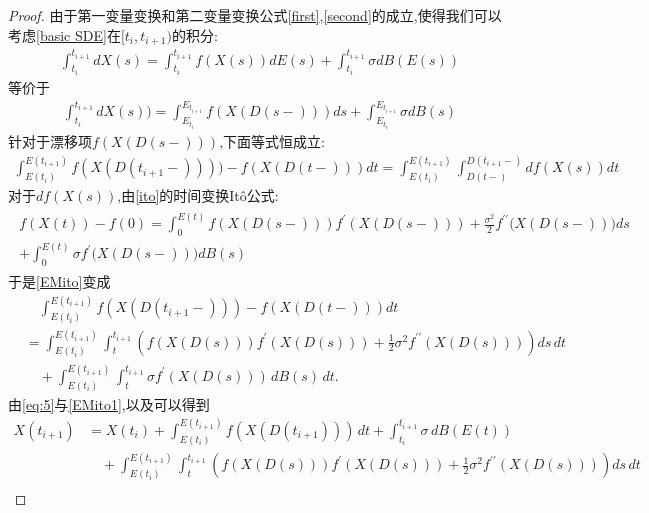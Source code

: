 \begin{proof}
	由于第一变量变换和第二变量变换公式\cref{first},\cref{second}的成立,使得我们可以考虑\cref{basic SDE}在$[t_i,t_{i+1})$的积分:
	\begin{align}
		\int_{t_i}^{t_{i+1}}dX(s)=\int_{t_i}^{t_{i+1}}f(X(s))dE(s)+\int_{t_i}^{t_{i+1}}\sigma dB(E(s))
	\end{align}
	等价于
	\begin{align}\label{eq:5}
		\int_{t_i}^{t_{i+1}}dX(s))=\int_{E_{t_i}}^{E_{t_{i+1}}}f(X(D(s-)))ds+\int_{E_{t_i}}^{E_{t_{i+1}}}\sigma dB(s)
	\end{align}
	针对于漂移项$f(X(D(s-)))$,下面等式恒成立:
	\begin{align}\label{EMito}
		\int_{E(t_i)}^{E(t_{i+1})} f(X(D(t_{i+1}-)))) - f(X(D(t-))) dt = \int_{E(t_i)}^{E(t_{i+1})} \int^{D(t_{i+1}-)}_{D(t-)} df(X(s)) dt
	\end{align}
	对于$df(X(s))$,由\cref{ito}的时间变换It\^{o}公式:
	\begin{align*}
		\begin{gathered}
			f(X(t))-f(0)=\int_{0}^{E(t)}f(X(D(s-)))f^{\prime}\left(X(D(s-))\right)+\frac{\sigma^{2}}{2}f^{\prime\prime}\big(X(D(s-))\big)ds \\
			+\int_{0}^{E(t)}\sigma f^{\prime}\big(X(D(s-))\big)dB(s)
		\end{gathered}
	\end{align*}
	于是\cref{EMito}变成
	\begin{equation}\label{EMito1}
		\begin{aligned}
			&\quad\int_{E(t_i)}^{E(t_{i+1})} f(X(D(t_{i+1}-))) - f(X(D(t-))) dt \\
			&= \int_{E(t_i)}^{E(t_{i+1})} \int_{t}^{t_{i+1}} \left( f(X(D(s))) f^{\prime}(X(D(s))) + \frac{1}{2} \sigma^2 f^{\prime\prime}(X(D(s))) \right) ds \, dt\\
			&\quad + \int_{E(t_i)}^{E(t_{i+1})} \int_{t}^{t_{i+1}} \sigma f^{\prime}(X(D(s))) \, dB(s) \, dt .
		\end{aligned}
	\end{equation}
	由\cref{eq:5}与\cref{EMito1},以及\cite[Theorem 3.1]{kobayashi2011stochastic}可以得到
	\begin{align*}
		X(t_{i+1}) 
		&= X(t_i) + \int_{E(t_i)}^{E(t_{i+1})} f(X({D(t_{i+1})})) \, dt + \int_{t_i}^{t_{i+1}} \sigma \, dB(E(t)) \\
		&\quad + \int_{E(t_i)}^{E(t_{i+1})} \int_{t}^{t_{i+1}}\left( f(X(D(s))) f^{\prime}(X(D(s))) + \frac{1}{2} \sigma^2 f^{\prime\prime}(X(D(s))) \right) ds \, dt \\

\end{align*}
\end{proof}
